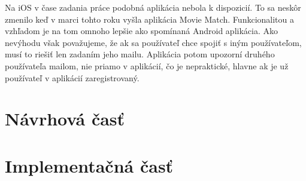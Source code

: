 Na iOS v čase zadania práce podobná aplikácia nebola k dispozicií. To sa neskôr zmenilo keď v marci tohto roku vyšla aplikácia Movie Match. Funkcionalitou a vzhľadom je na tom omnoho lepšie ako spomínaná Android aplikácia. Ako nevýhodu však považujeme, že ak sa používateľ chce spojiť s iným používateľom, musí to riešiť len zadaním jeho mailu. Aplikácia potom upozorní druhého používateľa mailom, nie priamo v aplikácií, čo je nepraktické, hlavne ak je už používateľ v aplikácií zaregistrovaný. 


\section{Návrhová časť}
\section{Implementačná časť}










